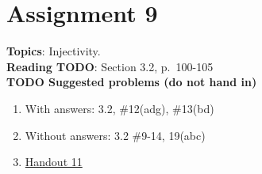\documentclass[12pt]{article}
\begin{document}
\section[9 (due \csname dateWeek9\endcsname): Injectivity.]{Assignment 9}

\textbf{Topics}: Injectivity.
\\

\noindent \textbf{Reading TODO}: Section 3.2, p.~100-105
\\





\noindent \textbf{TODO Suggested problems (do not hand in)}

\begin{enumerate}
\item With answers: 3.2, \#12(adg), \#13(bd)
\item Without answers: 3.2 \#9-14, 19(abc)
\item \href{https://www.math.emory.edu/~dzb/teaching/250Fall2021/handouts/250-H11-injectivity.pdf}{Handout 11}
\end{enumerate}
\end{document}
